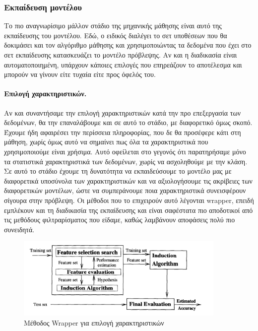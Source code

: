 \documentclass{article}
\begin{document}
\subsubsection{Εκπαίδευση μοντέλου}
Το πιο αναγνωρίσιμο μάλλον στάδιο της μηχανικής μάθησης είναι αυτό της εκπαίδευσης του μοντέλου. Εδώ, ο ειδικός διαλέγει το σετ υποθέσεων που θα δοκιμάσει και τον αλγόριθμο μάθησης και χρησιμοποιώντας τα δεδομένα που έχει στο σετ εκπαίδευσης κατασκευάζει το μοντέλο πρόβλεψης. Αν και η διαδικασία είναι αυτοματοποιημένη, υπάρχουν κάποιες επιλογές που επηρεάζουν το αποτέλεσμα και μπορούν να γίνουν είτε τυχαία είτε προς όφελός του.

\paragraph{Επιλογή χαρακτηριστικών.} Αν και συναντήσαμε την επιλογή χαρακτηριστικών κατά την προ επεξεργασία των δεδομένων, θα την επαναλάβουμε και σε αυτό το στάδιο, με διαφορετικό όμως σκοπό. Έχουμε ήδη αφαιρέσει την περίσσεια πληροφορίας, που δε θα προσέφερε κάτι στη μάθηση, χωρίς όμως αυτό να σημαίνει πως όλα τα χαρακτηριστικά που χρησιμοποιούμε είναι χρήσιμα. Αυτό οφείλεται στο γεγονός ότι παρατηρήσαμε μόνο τα στατιστικά χαρακτηριστικά των δεδομένων, χωρίς να ασχοληθούμε με την κλάση. Σε αυτό το στάδιο έχουμε τη δυνατότητα να εκπαιδεύσουμε το μοντέλο μας με διαφορετικά υποσύνολα των χαρακτηριστικών και να αξιολογήσουμε τις ακρίβειες των διαφορετικών μοντέλων, ώστε να συμπεράνουμε ποια χαρακτηριστικά συνεισφέρουν σίγουρα στην πρόβλεψη. Οι μέθοδοι που το επιχειρούν αυτό λέγονται wrapper, επειδή εμπλέκουν και τη διαδικασία της εκπαίδευσης και είναι σαφέστατα πιο αποδοτικοί από τις μεθόδους φιλτραρίσματος που είδαμε, καθώς λαμβάνουν αποφάσεις πολύ πιο συνειδητά.
\begin{figure}[H]
	\centering			
    \includegraphics[width=0.9\textwidth]{wrapper.png}
    \caption[Μέθοδος Wrapper για επιλογή χαρακτηριστικών]{Μέθοδος Wrapper για επιλογή χαρακτηριστικών}
 \end{figure}
 
\end{document}

